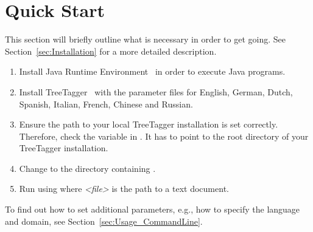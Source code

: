 \section{Quick Start}\label{sec:QuickStart}
This section will briefly outline what is necessary in order to get \product{} going. See Section~\ref{sec:Installation} for a more detailed description.
\begin{enumerate}
\item Install Java Runtime Environment~\cite{Java} in order to execute Java programs.
\item Install TreeTagger~\cite{TreeTagger} with the parameter files for English, German, Dutch, Spanish, Italian, French, Chinese and Russian.
\item Ensure the path to your local TreeTagger installation is set correctly. Therefore, check the variable  in \configFile{}. It has to point to the root directory of your TreeTagger installation.
\item Change to the directory containing \executableFile{}.
\item Run \product{} using \newline {} \newline where \emph{<file>} is the path to a text document.
\end{enumerate}

To find out how to set additional parameters, e.g., how to specify the language and domain, see Section~\ref{sec:Usage_CommandLine}.